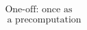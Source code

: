 \documentclass[preview]{standalone}
\begin{document}
\begin{align*}
\text{One-off: once as} \\\ \text{a precomputation}
\end{align*}
\end{document}
